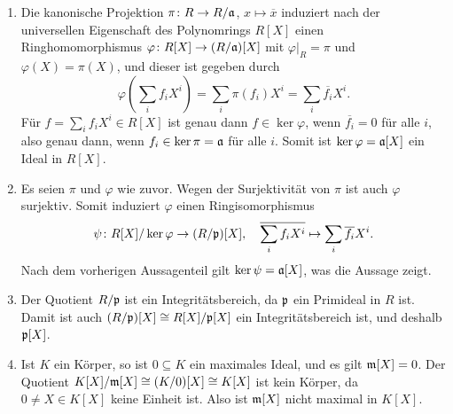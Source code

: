 \begin{solution}
  \begin{enumerate}
    \item
      Die kanonische Projektion $\pi \colon R \to R/\mathfrak{a}$, $x \mapsto \overline{x}$ induziert nach der universellen Eigenschaft des Polynomrings $R[X]$ einen Ringhomomorphismus $\varphi \colon R[X] \to (R/\mathfrak{a})[X]$ mit $\varphi|_R = \pi$ und $\varphi(X) = \pi(X)$, und dieser ist gegeben durch
      \[
          \varphi\left( \sum_i f_i X^i \right)
        = \sum_i \pi(f_i) X^i
        = \sum_i \overline{f_i} X^i.
      \]
      Für $f = \sum_i f_i X^i \in R[X]$ ist genau dann $f \in \ker \varphi$, wenn $\overline{f_i} = 0$ für alle $i$, also genau dann, wenn $f_i \in \ker \pi = \mathfrak{a}$ für alle $i$.
      Somit ist $\ker \varphi = \mathfrak{a}[X]$ ein Ideal in $R[X]$.
    \item
      Es seien $\pi$ und $\varphi$ wie zuvor.
      Wegen der Surjektivität von $\pi$ ist auch $\varphi$ surjektiv.
      Somit induziert $\varphi$ einen Ringisomorphismus
      \[
        \psi \colon R[X] / \ker \varphi \to (R/\mathfrak{p})[X],
        \quad
        \overline{\sum_i f_i X^i} \mapsto \sum_i \overline{f_i} X^i.
      \]
      Nach dem vorherigen Aussagenteil gilt $\ker \psi = \mathfrak{a}[X]$, was die Aussage zeigt.
    \item
      Der Quotient $R/\mathfrak{p}$ ist ein Integritätsbereich, da $\mathfrak{p}$ ein Primideal in $R$ ist.
      Damit ist auch $(R/\mathfrak{p})[X] \cong R[X]/\mathfrak{p}[X]$ ein Integritätsbereich ist, und deshalb $\mathfrak{p}[X]$.
    \item
      Ist $K$ ein Körper, so ist $0 \subseteq K$ ein maximales Ideal, und es gilt $\mathfrak{m}[X] = 0$.
      Der Quotient $K[X]/\mathfrak{m}[X] \cong (K/0)[X] \cong K[X]$ ist kein Körper, da $0 \neq X \in K[X]$ keine Einheit ist.
      Also ist $\mathfrak{m}[X]$ nicht maximal in $K[X]$.
      

\end{enumerate}
\end{solution}
